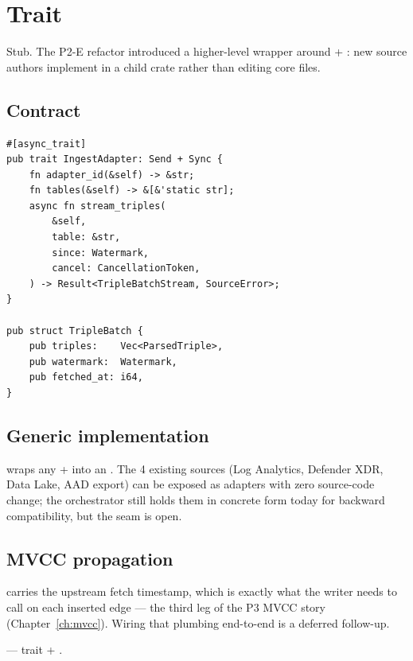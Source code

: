 \chapter{ Trait}
\label{ch:ingest-adapter}

\begin{note}
Stub. The P2-E refactor introduced a higher-level wrapper around
 + : new source authors implement
 in a child crate rather than editing core
files.
\end{note}

\section{Contract}

\begin{lstlisting}[style=rust]
#[async_trait]
pub trait IngestAdapter: Send + Sync {
    fn adapter_id(&self) -> &str;
    fn tables(&self) -> &[&'static str];
    async fn stream_triples(
        &self,
        table: &str,
        since: Watermark,
        cancel: CancellationToken,
    ) -> Result<TripleBatchStream, SourceError>;
}

pub struct TripleBatch {
    pub triples:    Vec<ParsedTriple>,
    pub watermark:  Watermark,
    pub fetched_at: i64,
}
\end{lstlisting}

\section{Generic implementation}

 wraps any  + 
into an . The 4 existing sources (Log
Analytics, Defender XDR, Data Lake, AAD export) can be exposed as
adapters with zero source-code change; the orchestrator still holds
them in concrete form today for backward compatibility, but the
seam is open.

\section{MVCC propagation}

 carries the upstream fetch timestamp,
which is exactly what the writer needs to call
 on each inserted edge ---
the third leg of the P3 MVCC story (Chapter~\ref{ch:mvcc}).
Wiring that plumbing end-to-end is a deferred follow-up.

\begin{inthecode}
 --- trait +
.
\end{inthecode}
